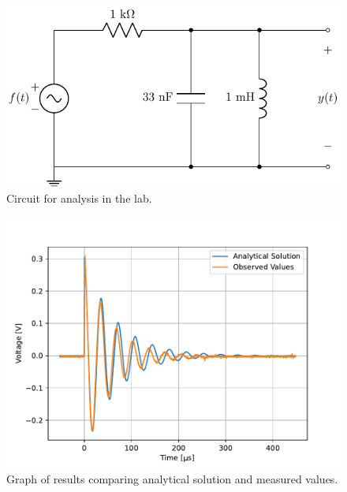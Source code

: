 \documentclass[11pt]{texMemo-gibbons}
\begin{document}
\begin{figure}[h!]
  \centering
  \includegraphics[width=0.7\linewidth]{circuits/circuit_01.pdf}
  \caption{Circuit for analysis in the lab.}
  \label{fig:circuit}
\end{figure}

\begin{figure}[h!]
  \centering
  \includegraphics[width=0.7\linewidth]{plots/plot.pdf}
  \caption{Graph of results comparing analytical solution and measured values.}
  \label{fig:plot}
\end{figure}
\end{document}
